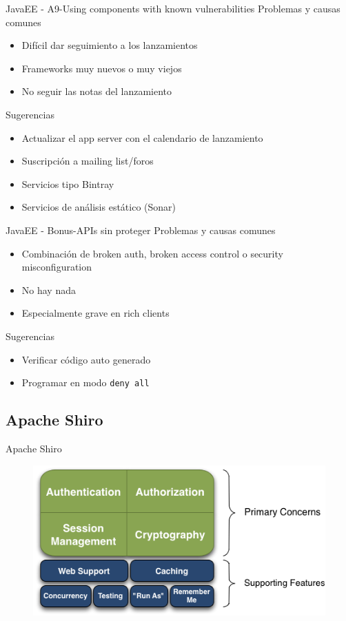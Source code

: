 \documentclass{beamer}
\begin{document}
\begin{frame}{JavaEE - A9-Using components with known vulnerabilities}
Problemas y causas comunes
\begin{itemize}
	\item Difícil dar seguimiento a los lanzamientos
	\item Frameworks muy nuevos o muy viejos
	\item No seguir las notas del lanzamiento
\end{itemize}

Sugerencias
\begin{itemize}
	\item Actualizar el app server con el calendario de lanzamiento
	\item Suscripción a mailing list/foros
	\item Servicios tipo Bintray
	\item Servicios de análisis estático (Sonar)
\end{itemize}
\end{frame}

\begin{frame}{JavaEE - Bonus-APIs sin proteger}
Problemas y causas comunes
\begin{itemize}
	\item Combinación de broken auth, broken access control o security misconfiguration
	\item No hay nada
	\item Especialmente grave en rich clients
\end{itemize}

Sugerencias
\begin{itemize}
	\item Verificar código auto generado
	\item Programar en modo \texttt{deny all}
\end{itemize}
\end{frame}


\subsection{Apache Shiro}

\begin{frame}{Apache Shiro}
\begin{figure}
	\centering
	\includegraphics[width=0.7\linewidth]{Images/ShiroFeatures}
\end{figure}

\end{frame}
\end{document}
